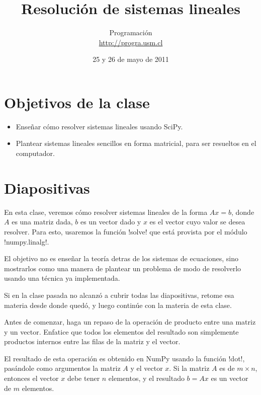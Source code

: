 \documentclass[10pt]{article}
\title{Resolución de sistemas lineales}
\author{Programación \\ \url{http://progra.usm.cl}}
\date{25 y 26 de mayo de 2011}
\begin{document}
  \maketitle

  \section*{Objetivos de la clase}
  \begin{itemize}
    \item Enseñar cómo resolver sistemas lineales usando SciPy.
    \item Plantear sistemas lineales sencillos
      en forma matricial, para ser resueltos en el computador.
  \end{itemize}

  \section*{Diapositivas}

  En esta clase,
  veremos cómo resolver sistemas lineales
  de la forma \(Ax = b\),
  donde \(A\) es una matriz dada,
  \(b\) es un vector dado
  y \(x\) es el vector cuyo valor se desea resolver.
  Para esto, usaremos la función \li!solve!
  que está provista por el módulo \li!numpy.linalg!.

  El objetivo no es enseñar la teoría detras de los sistemas de ecuaciones,
  sino mostrarlos como una manera de plantear un problema
  de modo de resolverlo usando una técnica ya implementada.

  Si en la clase pasada no alcanzó a cubrir todas las diapositivas,
  retome esa materia desde donde quedó,
  y luego continúe con la materia de esta clase.


  Antes de comenzar, haga un repaso de la operación
  de producto entre una matriz y un vector.
  Enfatice que todos los elementos del resultado
  son simplemente productos internos entre las filas de la matriz
  y el vector.

  El resultado de esta operación
  es obtenido en NumPy usando la función \li!dot!,
  pasándole como argumentos la matriz \(A\) y el vector \(x\).
  Si la matriz \(A\) es de \(m\times n\),
  entonces el vector \(x\) debe tener \(n\) elementos,
  y el resultado \(b = Ax\) es un vector de \(m\) elementos.

\end{document}
